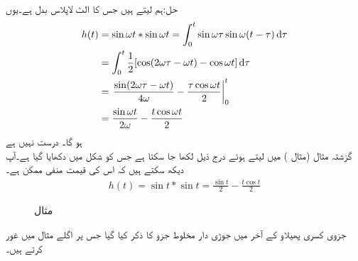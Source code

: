 حل:ہم  لیتے ہیں جس کا الٹ لاپلاس بدل  ہے۔یوں 
\begin{align*}
h(t)&=\sin \omega t* \sin \omega t=\int_{0}^{t} \sin \omega \tau \sin \omega(t-\tau)\dif \tau\\
&=\int_{0}^{t} \frac{1}{2}[\cos(2\omega \tau-\omega t)-\cos \omega t]\dif \tau\\
&=\left.\frac{\sin(2\omega \tau-\omega t)}{4\omega}-\frac{\tau \cos \omega t}{2}\right|_{0}^{t}\\
&=\frac{\sin \omega t}{2\omega}-\frac{t\cos \omega t}{2}
\end{align*}
ہو گا۔
\quad {} درست نہیں ہے\\
گزشتہ مثال (مثال ) میں   لیتے ہوئے درج ذیل لکھا جا سکتا ہے جس کو شکل  میں دکھایا گیا ہے۔آپ دیکھ سکتے ہیں کہ اس کی قیمت منفی ممکن ہے۔
\begin{align*}
h(t)=\sin t*\sin t=\frac{\sin t}{2}-\frac{t\cos t}{2}
\end{align*}
%
\begin{figure}
\centering
{}
\caption{مثال }
\label{شکل_مثال_لاپلاس_الجھاو_سائن_مربع_دوبارہ}
\end{figure}


جزوی کسری پھیلاو کے آخر میں جوڑی دار مخلوط جزو کا ذکر کیا گیا جس پر اگلے مثال میں غور کرتے ہیں۔


